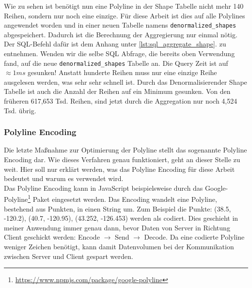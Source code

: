     Wie zu sehen ist benötigt nun eine Polyline in der Shape Tabelle nicht mehr 140 Reihen, sondern nur noch eine einzige. Für diese Arbeit ist dies auf alle Polylines angewendet worden und in einer neuen Tabelle namens \texttt{denormalized\_shapes} abgespeichert. Dadurch ist die Berechnung der Aggregierung nur einmal nötig. Der SQL-Befehl dafür ist dem Anhang unter \ref{lst:sql_aggregate_shape}. zu entnehmen.
    Wenden wir die selbe SQL Abfrage, die bereits oben Verwendung fand, auf die neue \texttt{denormalized\_shapes} Tabelle an. Die Query Zeit ist auf $\approx1ms$ gesunken! Anstatt hunderte Reihen muss nur eine einzige Reihe ausgelesen werden, was sehr sehr schnell ist. Durch das Denormalisieren\footnotemark der Shape Tabelle ist auch die Anzahl der Reihen auf ein Minimum gesunken. Von den früheren 617,653 Tsd. Reihen, sind jetzt durch die Aggregation nur noch 4,524 Tsd. übrig.

  

  \subsubsection*{Polyline Encoding}
  \label{ssub:polyline_encoding}
    Die letzte Maßnahme zur Optimierung der Polyline stellt das sogenannte Polyline Encoding dar. Wie dieses Verfahren genau funktioniert, geht an dieser Stelle zu weit. Hier soll nur erklärt werden, was das Polyline Encoding für diese Arbeit bedeutet und warum es verwendet wird.\\

    Das Polyline Encoding kann in JavaScript beispielsweise durch das Google-Polyline\footnote{\url{https://www.npmjs.com/package/google-polyline}} Paket eingesetzt werden. Das Encoding wandelt eine Polyline, bestehend aus Punkten, in einen String um. Zum Beispiel die Punkte: (38.5, -120.2), (40.7, -120.95), (43.252, -126.453) werden als
    \colorbox{materialGrey}{\texttt{\color{white}{\_p\textasciitilde iF\textasciitilde ps|U\_ulLnnqC\_mqNvxq`@}}}
    codiert. Dies geschieht in meiner Anwendung immer genau dann, bevor Daten von Server in Richtung Client geschickt werden: Encode $\rightarrow$ Send $\rightarrow$ Decode. Da eine codierte Polyline weniger Zeichen benötigt, kann damit Datenvolumen bei der Kommunikation zwischen Server und Client gespart werden.



